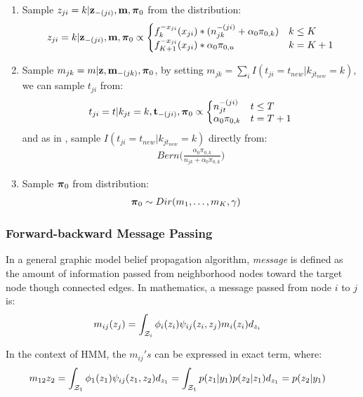 \documentclass{article} %
\begin{document}
\begin{enumerate}
\item Sample $z_{ji} = k | {\bf z}_{-(ji)}, {\bf m}, \boldsymbol{\pi}_0$ from the distribution:
\begin{align*}
z_{ji} = k | \bz_{-(ji)}, \bm, \bpi_0 \propto 
\left\{\begin{matrix*}[l]
f_k^{-x_{ji}}(x_{ji}) * (n_{jk}^{-(ji)} + \alpha_0 \pi_{0, k})  & k \leq K
\\ 
f_{K+1}^{-x_{ji}}(x_{ji}) * \alpha_0 \pi_{0, u}   & k = K+1
\end{matrix*}\right.
\end{align*}
\item Sample $m_{jk} = m | {\bf z}, {\bf m}_{-(jk)}, \boldsymbol{\pi}_0$, by setting $m_{jk} = \sum_{i} I(t_{ji} = t_{new}|k_{jt_{new}} = k)$,
we can sample $t_{ji}$ from:
\begin{align*}
t_{ji} = t | k_{jt} = k, \bt_{-(ji)}, \bpi_0 \propto
\left\{\begin{matrix*}[l]
n_{jt}^{-(ji)}  & t \leq T
\\ 
\alpha_0 \pi_{0, k}  & t = T+1
\end{matrix*}\right.
\end{align*}
and as in \cite{fox_bayesian_2009}, sample $I(t_{ji} = t_{new}|k_{jt_{new}} = k)$ directly from:
\begin{align*}
Bern \Big(\frac{\alpha_0 \pi_{0, k}}{n_{jk} + \alpha_0 \pi_{0, k}} \Big) 
\end{align*}

\item Sample $\boldsymbol{\pi}_0$ from distribution:
\begin{align*}
\boldsymbol{\pi}_0 & \sim Dir(m_1, \dots, m_K, \gamma)
\end{align*}
\end{enumerate}


\subsubsection{Forward-backward Message Passing}
In a general graphic model belief propagation algorithm, \textit{message} is defined as the amount of information passed from neighborhood nodes toward the target node though connected edges. In mathematics, a message passed from node $i$ to $j$ is:
\begin{align*}
m_{ij}(z_j) &= \int_{{\cal Z}_i} \phi_i(z_i) \psi_{ij}(z_i, z_j) m_i(z_i) d_{z_i}
\end{align*}

In the context of HMM, the $m_{ij}'s$ can be expressed in exact term, where:
\begin{align*}
m_{12}{z_2} &= \int_{{\cal Z}_1} \phi_1(z_1) \psi_{ij}(z_1, z_2) d_{z_1}
= \int_{{\cal Z}_1} p(z_1|y_1) p(z_2|z_1) d_{z_1} = p(z_2|y_1)
\end{align*}
\end{document}
